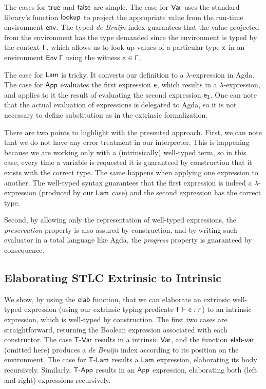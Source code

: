 \documentclass[tese,capa,english]{texufpel}
\newcommand{\D}[1]{\blue{\mathsf{#1}}}
\newcommand{\Con}[1]{\green{\mathsf{#1}}}
\newcommand{\F}[1]{\blue{\mathsf{#1}}}
\newcommand{\V}[1]{\black{\mathsf{#1}}}
\newcommand{\HC}[1]{\green{\mathsf{#1}}}
\begin{document}
The cases for \ensuremath{\Con{true}} and \ensuremath{\Con{false}} are simple. The case for \ensuremath{\HC{Var}} uses the standard library's function \ensuremath{\F{lookup}} to project the appropriate value from the run-time environment \ensuremath{\V{env}}. The typed \emph{de Bruijn} index guarantees that the value projected from the environment has the type demanded since the environment is typed by the context \ensuremath{\V{\Gamma}}, which allows us to look up values of a particular type \ensuremath{\V{x}} in an environment \ensuremath{\D{Env}\;\V{\Gamma}} using the witness \ensuremath{\V{x}\;\D{\in}\;\V{\Gamma}}.

The case for \ensuremath{\HC{Lam}} is tricky. It converts our definition to a $\lambda$-expression in Agda. The case for \ensuremath{\HC{App}} evaluates the first expression \ensuremath{\V{e}}, which results in a $\lambda$-expression, and applies to it the result of evaluating the second expression \ensuremath{\V{e_1}}. One can note that the actual evaluation of expressions is delegated to Agda, so it is not necessary to define substitution as in the extrinsic formalization.

There are two points to highlight with the presented approach. First, we can note that we do not have any error treatment in our interpreter. This is happening because we are working only with a (intrinsically) well-typed term, so in this case, every time a variable is requested it is guaranteed by construction that it exists with the correct type. The same happens when applying one expression to another. The well-typed syntax guarantees that the first expression is indeed a $\lambda$-expression (produced by our \ensuremath{\HC{Lam}} case) and the second expression has the correct type.

Second, by allowing only the representation of well-typed expressions, the \emph{preservation} property is also assured by construction, and by writing such evaluator in a total language like Agda, the \emph{progress} property is guaranteed by consequence.

\pagebreak

\subsection{Elaborating STLC Extrinsic to Intrinsic}

We show, by using the \ensuremath{\D{elab}} function, that we can elaborate an extrinsic well-typed expression (using our extrinsic typing predicate \ensuremath{\V{\Gamma}\;\F{\vdash}\;\V{e}\;\D{:}\;\V{\tau}}) to an intrinsic expression, which is well-typed by construction. The first two cases are straightforward, returning the Boolean expression associated with each constructor. The case \ensuremath{\Con{T\textrm{-}Var}} results in a intrinsic \ensuremath{\HC{Var}}, and the function \ensuremath{\D{elab\textrm{-}var}} (omitted here) produces a \emph{de Bruijn} index according to its position on the environment. The case for \ensuremath{\Con{T\textrm{-}Lam}} results a \ensuremath{\HC{Lam}} expression, elaborating its body recursively. Similarly, \ensuremath{\Con{T\textrm{-}App}} results in an \ensuremath{\HC{App}} expression, elaborating both (left and right) expressions recursively.
\end{document}
